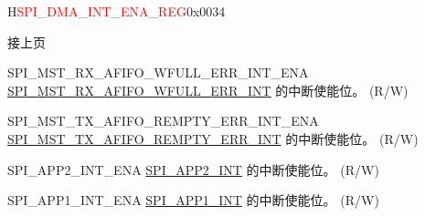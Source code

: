 \addtocounter{Regfloat}{-1}
\begin{register}{H}{\textcolor{red}{SPI\_DMA\_INT\_ENA\_REG}}{0x{}0034}
\begin{regdesc}\begin{reglist}
\item [接上页]
\label{fielddesc:SPIMSTRXAFIFOWFULLERRINTENA}\item [SPI\_MST\_RX\_AFIFO\_WFULL\_ERR\_INT\_ENA] \hyperref[int:SPIMSTRXAFIFOWFULLERRINT]{SPI\_MST\_RX\_AFIFO\_WFULL\_ERR\_INT} 的中断使能位。 (R/W)
\label{fielddesc:SPIMSTTXAFIFOREMPTYERRINTENA}\item [SPI\_MST\_TX\_AFIFO\_REMPTY\_ERR\_INT\_ENA] \hyperref[int:SPIMSTTXAFIFOREMPTYERRINT]{SPI\_MST\_TX\_AFIFO\_REMPTY\_ERR\_INT} 的中断使能位。 (R/W)
\label{fielddesc:SPIAPP2INTENA}\item [SPI\_APP2\_INT\_ENA] \hyperref[int:SPIAPP2INT]{SPI\_APP2\_INT} 的中断使能位。 (R/W)
\label{fielddesc:SPIAPP1INTENA}\item [SPI\_APP1\_INT\_ENA] \hyperref[int:SPIAPP1INT]{SPI\_APP1\_INT} 的中断使能位。 (R/W)
\end{reglist}\end{regdesc}
\end{register}


